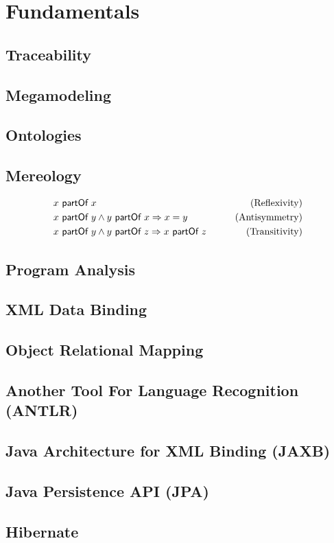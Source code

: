 \chapter{Fundamentals}
\lipsum[1]


\section{Traceability}
\lipsum[1]

\section{Megamodeling}
\lipsum[1]

\section{Ontologies}
\lipsum[1]

\section{Mereology}
\begin{align}
&x ~\textsf{partOf}~ x 
&\qquad \text{(Reflexivity)}
\\&x ~\textsf{partOf}~ y \wedge y ~\textsf{partOf}~ x \Rightarrow x = y
&\qquad \text{(Antisymmetry)}
\\&x ~\textsf{partOf}~ y \wedge y ~\textsf{partOf}~ z \Rightarrow x ~\textsf{partOf}~ z
&\qquad \text{(Transitivity)}
\end{align}
\lipsum[1]

\section{Program Analysis}
\lipsum[1]

\section{XML Data Binding}
\lipsum[1]

\section{Object Relational Mapping}
\lipsum[1]



\section{Another Tool For Language Recognition (ANTLR)}

\section{Java Architecture for XML Binding (JAXB)}

\section{Java Persistence API (JPA)}

\section{Hibernate}


